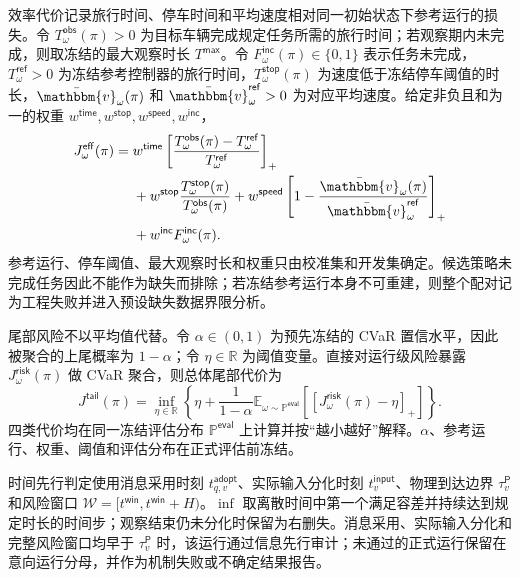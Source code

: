 \documentclass[10pt,a4paper,twocolumn]{article}
\begin{document}
效率代价记录旅行时间、停车时间和平均速度相对同一初始状态下参考运行的损失。令 $T_{\omega}^{\mathsf{obs}}(\pi)>0$ 为目标车辆完成规定任务所需的旅行时间；若观察期内未完成，则取冻结的最大观察时长 $T^{\mathsf{max}}$。令 $F_{\omega}^{\mathsf{inc}}(\pi)\in\{0,1\}$ 表示任务未完成，$T_{\omega}^{\mathsf{ref}}>0$ 为冻结参考控制器的旅行时间，$T_{\omega}^{\mathsf{stop}}(\pi)$ 为速度低于冻结停车阈值的时长，$\bar{\mathbbm{v}}_{\omega}(\pi)$ 和 $\bar{\mathbbm{v}}_{\omega}^{\mathsf{ref}}>0$ 为对应平均速度。给定非负且和为一的权重 $w^{\mathsf{time}},w^{\mathsf{stop}},w^{\mathsf{speed}},w^{\mathsf{inc}}$，
\begin{equation*}
\begin{aligned}
J_{\omega}^{\mathsf{eff}}(\pi)
={}&w^{\mathsf{time}}\left[
\frac{T_{\omega}^{\mathsf{obs}}(\pi)-T_{\omega}^{\mathsf{ref}}}
{T_{\omega}^{\mathsf{ref}}}\right]_+\\
&+w^{\mathsf{stop}}\frac{T_{\omega}^{\mathsf{stop}}(\pi)}
{T_{\omega}^{\mathsf{obs}}(\pi)}
+w^{\mathsf{speed}}\left[
1-\frac{\bar{\mathbbm{v}}_{\omega}(\pi)}{\bar{\mathbbm{v}}_{\omega}^{\mathsf{ref}}}\right]_+\\
&+w^{\mathsf{inc}}F_{\omega}^{\mathsf{inc}}(\pi).
\end{aligned}
\end{equation*}
参考运行、停车阈值、最大观察时长和权重只由校准集和开发集确定。候选策略未完成任务因此不能作为缺失而排除；若冻结参考运行本身不可重建，则整个配对记为工程失败并进入预设缺失数据界限分析。

尾部风险不以平均值代替。令 $\alpha\in(0,1)$ 为预先冻结的 CVaR 置信水平，因此被聚合的上尾概率为 $1-\alpha$；令 $\eta\in\mathbb R$ 为阈值变量。直接对运行级风险暴露 $J_{\omega}^{\mathsf{risk}}(\pi)$ 做 CVaR 聚合，则总体尾部代价为
\begin{equation*}
J^{\mathsf{tail}}(\pi)=
\inf_{\eta\in\mathbb R}
\left\{\eta+\frac{1}{1-\alpha}
\mathbb E_{\omega\sim\mathbb P^{\mathsf{eval}}}\!\left[\left[J_{\omega}^{\mathsf{risk}}(\pi)-\eta\right]_+\right]\right\}.
\end{equation*}
四类代价均在同一冻结评估分布 $\mathbb P^{\mathsf{eval}}$ 上计算并按“越小越好”解释。$\alpha$、参考运行、权重、阈值和评估分布在正式评估前冻结。

时间先行判定使用消息采用时刻 $t_{q,v}^{\mathsf{adopt}}$、实际输入分化时刻 $t_v^{\mathsf{input}}$、物理到达边界 $\tau_v^{\mathsf P}$ 和风险窗口 $\mathcal W=[t^{\mathsf{win}},t^{\mathsf{win}}+H)$。$\inf$ 取离散时间中第一个满足容差并持续达到规定时长的时间步；观察结束仍未分化时保留为右删失。消息采用、实际输入分化和完整风险窗口均早于 $\tau_v^{\mathsf P}$ 时，该运行通过信息先行审计；未通过的正式运行保留在意向运行分母，并作为机制失败或不确定结果报告。
\end{document}
